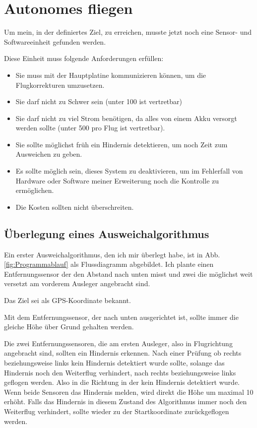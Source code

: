 \section{Autonomes fliegen}
\label{sec:autonomes_fliegen}

Um mein, in der  definiertes Ziel, zu erreichen,
musste jetzt noch eine Sensor- und Softwareeinheit gefunden werden.

Diese Einheit muss folgende Anforderungen erfüllen:
\begin{itemize}
	\item Sie muss mit der Hauptplatine kommunizieren können,
		um die Flugkorrekturen umzusetzen.
	\item Sie darf nicht zu Schwer sein (unter \unit{100}{\gram} ist vertretbar)
	\item Sie darf nicht zu viel Strom benötigen,
		da alles von einem Akku versorgt werden sollte
		(unter \unit{500}{\milli\ampere} pro Flug ist vertretbar).
	\item Sie sollte möglichst früh ein Hindernis detektieren,
		um noch Zeit zum Ausweichen zu geben.
	\item Es sollte möglich sein, dieses System zu deaktivieren,
		um im Fehlerfall von Hardware oder Software meiner Erweiterung
		noch die Kontrolle zu ermöglichen.
	\item Die Kosten sollten 
		nicht überschreiten.
\end{itemize}

\subsection{Überlegung eines Ausweichalgorithmus}
Ein erster Ausweichalgorithmus, den ich mir überlegt habe, ist
in Abb. \vref{fig:Programmablauf} als Flussdiagramm abgebildet.
Ich plante einen Entfernungssensor der den
Abstand nach unten misst und zwei die möglichst weit versetzt am
vorderem Ausleger angebracht sind.

Das Ziel sei als \ac{GPS}-Koordinate bekannt.

Mit dem Entfernungssensor, der nach unten ausgerichtet ist,
sollte immer die gleiche Höhe über Grund gehalten werden.

Die zwei Entfernungssensoren, die am ersten Ausleger,
also in Flugrichtung angebracht sind,
sollten ein Hindernis erkennen.
Nach einer Prüfung ob rechts beziehungsweise links kein
Hindernis detektiert wurde sollte, solange
das Hindernis noch den Weiterflug verhindert,
nach rechts beziehungsweise links geflogen werden.
Also in die Richtung in der kein Hindernis detektiert wurde.
Wenn beide Sensoren das Hindernis melden, wird direkt
die Höhe um maximal \unit{10}{\metre} erhöht.
Falls das Hindernis in diesem Zustand des Algorithmus
immer noch den Weiterflug verhindert, sollte wieder zu
der Startkoordinate zurückgeflogen werden.

